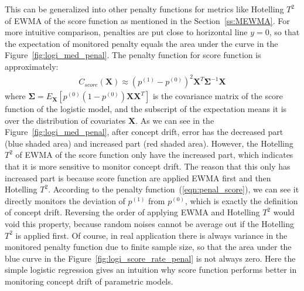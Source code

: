 \documentclass[twoside,11pt]{article}
\begin{document}
This can be generalized into other penalty functions for metrics like Hotelling $T^2$ of EWMA of the score function as mentioned in the Section~\ref{ss:MEWMA}. For more intuitive comparison, penalties are put close to horizontal line $y=0$, so that the expectation of monitored penalty equals the area under the curve in the Figure~\ref{fig:logi_med_penal}. 
The penalty function for score function is approximately:
\begin{align}
C _{score}(\bm {X}) \approx (p ^{(1)} - p ^{(0)})^2 \bm {X}^T\bm { \Sigma}^{-1}\bm {X}
\label{eqn:penal_score}
\end{align}
where $\bm { \Sigma} = E _{\bm {X}}[p ^{(0)}(1-p ^{(0)})\bm {X}\bm {X}^T]$ is the covariance matrix of the score function of the logistic model, and the subscript of the expectation means it is over the distribution of covariates $\bm {X}$. As we can see in the Figure~\ref{fig:logi_med_penal}, after concept drift, error has the decreased part (blue shaded area) and increased part (red shaded area). However, the Hotelling $T^2$ of EWMA of the score function only have the increased part, which indicates that it is more sensitive to monitor concept drift. The reason that this only has increased part is because score function are applied EWMA first and then Hotelling $T^2$. According to the penalty function~(\ref{eqn:penal_score}), we can see it directly monitors the deviation of $p ^{(1)}$ from $p ^{(0)}$, which is exactly the definition of concept drift. Reversing the order of applying EWMA and Hotelling $T^2$ would void this property, because random noises cannot be average out if the Hotelling $T^2$ is applied first. Of course, in real application there is always variance in the monitored penalty function due to finite sample size, so that the area under the blue curve in the Figure~\ref{fig:logi_score_rate_penal} is not always zero. Here the simple logistic regression gives an intuition why score function performs better in monitoring concept drift of parametric models. 
\end{document}
